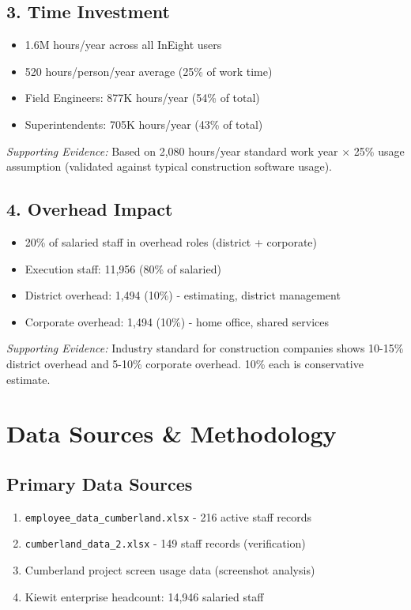 \documentclass[11pt, letterpaper]{article}
\begin{document}
\subsection*{3. Time Investment}
\begin{itemize}[nosep, leftmargin=2em]
    \item 1.6M hours/year across all InEight users
    \item 520 hours/person/year average (25\% of work time)
    \item Field Engineers: 877K hours/year (54\% of total)
    \item Superintendents: 705K hours/year (43\% of total)
\end{itemize}

\textit{Supporting Evidence:} Based on 2,080 hours/year standard work year $\times$ 25\% usage assumption (validated against typical construction software usage).

\subsection*{4. Overhead Impact}
\begin{itemize}[nosep, leftmargin=2em]
    \item 20\% of salaried staff in overhead roles (district + corporate)
    \item Execution staff: 11,956 (80\% of salaried)
    \item District overhead: 1,494 (10\%) - estimating, district management
    \item Corporate overhead: 1,494 (10\%) - home office, shared services
\end{itemize}

\textit{Supporting Evidence:} Industry standard for construction companies shows 10-15\% district overhead and 5-10\% corporate overhead. 10\% each is conservative estimate.

\vspace{1em}

\section*{Data Sources \& Methodology}

\subsection*{Primary Data Sources}
\begin{enumerate}[nosep, leftmargin=2em]
    \item \texttt{employee\_data\_cumberland.xlsx} - 216 active staff records
    \item \texttt{cumberland\_data\_2.xlsx} - 149 staff records (verification)
    \item Cumberland project screen usage data (screenshot analysis)
    \item Kiewit enterprise headcount: 14,946 salaried staff
\end{enumerate}
\end{document}
